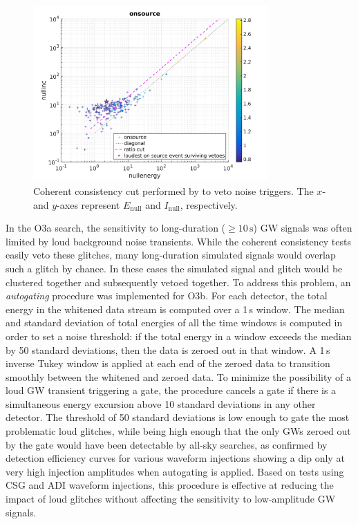 \begin{figure}[h]
	\includegraphics[width=0.8\textwidth]{figures/grb/coh-cut.png}
	\caption[Coherent consistency cut performed by \xpip to veto noise triggers.]{Coherent consistency cut performed by \xpip to veto noise triggers. The $x$- and $y$-axes represent $E_{\mathrm{null}}$ and $I_{\mathrm{null}}$, respectively.}
	\label{fig:coh-cut}
\end{figure}

In the O3a search, the sensitivity to long-duration ($\geq 10\,\text{s}$) GW signals was often limited by loud background noise transients.
While the coherent consistency tests easily veto these glitches, many long-duration simulated signals would overlap such a glitch by chance.
In these cases the simulated signal and glitch would be clustered together and subsequently vetoed together.
To address this problem, an \textit{autogating} procedure was implemented for O3b. For each detector, the total energy in the whitened data stream is computed over a 1\,s window.
The median and standard deviation of total energies of all the time windows is computed in order to set a noise threshold: if the total energy in a window exceeds the median by 50 standard deviations, then the data is zeroed out in that window.
A 1\,s inverse Tukey window is applied at each end of the zeroed data to transition smoothly between the whitened and zeroed data.
To minimize the possibility of a loud GW transient triggering a gate, the procedure cancels a gate if there is a simultaneous energy excursion above 10 standard deviations in any other detector.
The threshold of 50 standard deviations is low enough to gate the most problematic loud glitches, while being high enough that the only GWs zeroed out by the gate would have been detectable by all-sky searches, as confirmed by detection efficiency curves for various waveform injections showing a dip only at very high injection amplitudes when autogating is applied.
Based on tests using \ac{CSG} and \ac{ADI} waveform injections, this procedure is effective at reducing the impact of loud glitches without affecting the sensitivity to low-amplitude GW signals.


